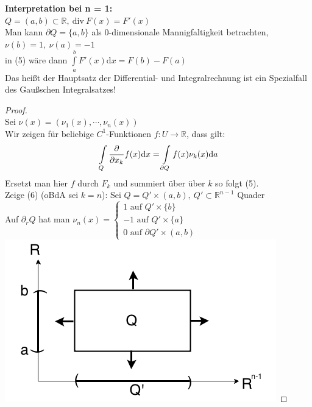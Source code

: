 \textbf{Interpretation bei n = 1:}\\
$Q = (a,b) \subset \mathbb{R}, \ \mathrm{div\ } F(x) = F'(x) $ \\
Man kann $\partial Q = \lbrace a, b \rbrace $ 
als 0-dimensionale Mannigfaltigkeit betrachten,\\
$\nu(b) = 1, \ \nu(a) = -1 $\\
in (5) wäre dann
$\int\limits_a^b F'(x) \mathrm{d}x = F(b) - F(a) $\\
Das heißt der Hauptsatz der Differential- und Integralrechnung ist
ein Spezialfall des Gaußschen Integralsatzes!

\begin{proof}
\mbox{} \\
Sei $\nu(x) = (\nu_1(x), \cdots, \nu_n(x)) $\\
Wir zeigen für beliebige $C^1$-Funktionen $f: U \rightarrow \mathbb{R} $,
dass gilt: \\
\begin{equation}
    \int\limits_Q \frac{\partial{}}{\partial{x_k}} f(x) \mathrm{d}x =
    \int\limits_{\partial Q} f(x) \nu_k (x) \mathrm{d}a
\end{equation}
Ersetzt man hier $f$ durch $F_k$ und summiert über über $k$ so folgt (5).\\
Zeige (6) (oBdA sei $k=n$):
Sei $Q = Q' \times (a,b), \ Q' \subset \mathbb{R}^{n-1} $ Quader\\
Auf $\partial_r Q $ hat man
$\nu_n (x) = 
\begin{cases}
    1 \text{ auf } Q' \times \lbrace b \rbrace \\
    -1 \text{ auf } Q' \times \lbrace a \rbrace \\
    0 \text{ auf } \partial Q' \times (a,b)
\end{cases}
$
\includegraphics[scale=0.3]{pictures/007-04}


\end{proof}
